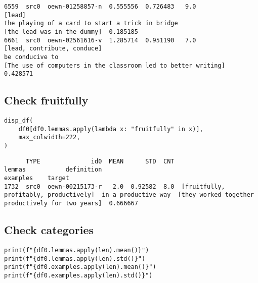 \documentclass[a4paper,10pt,onecolumn,oneside,openright]{article}
\begin{document}
\begin{verbatim}
6559  src0  oewn-01258857-n  0.555556  0.726483   9.0                                                    [lead]                                                                                  the playing of a card to start a trick in bridge                                                                                                                                                                  [the lead was in the dummy]  0.185185
6661  src0  oewn-02561616-v  1.285714  0.951190   7.0                               [lead, contribute, conduce]                                                                                                                   be conducive to                                                                                                                                [The use of computers in the classroom led to better writing]  0.428571
\end{verbatim}
\subsection{Check fruitfully}
\label{sec:orgc807e4a}
\begin{verbatim}
disp_df(
    df0[df0.lemmas.apply(lambda x: "fruitfully" in x)],
    max_colwidth=222,
)
\end{verbatim}

\begin{verbatim}
      TYPE              id0  MEAN      STD  CNT                                  lemmas           definition                                           examples    target
1732  src0  oewn-00215173-r   2.0  0.92582  8.0  [fruitfully, profitably, productively]  in a productive way  [they worked together productively for two years]  0.666667
\end{verbatim}

\subsection{Check categories}
\label{sec:org295d4f2}
\begin{verbatim}
print(f"{df0.lemmas.apply(len).mean()}")
print(f"{df0.lemmas.apply(len).std()}")
print(f"{df0.examples.apply(len).mean()}")
print(f"{df0.examples.apply(len).std()}")
\end{verbatim}
\end{document}
